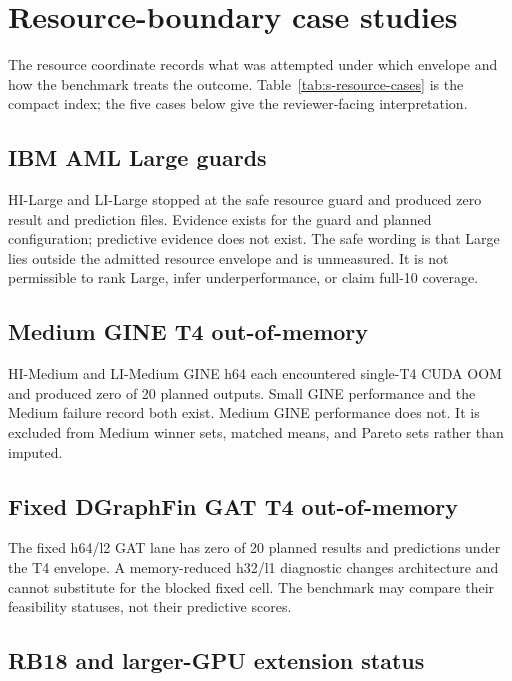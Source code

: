 \section{Resource-boundary case studies}
\label{sec:s-resource-cases-v2}

The resource coordinate records what was attempted under which envelope and how the benchmark treats the outcome. Table~\ref{tab:s-resource-cases} is the compact index; the five cases below give the reviewer-facing interpretation.



\subsection{IBM AML Large guards}

HI-Large and LI-Large stopped at the safe resource guard and produced zero result and prediction files. Evidence exists for the guard and planned configuration; predictive evidence does not exist. The safe wording is that Large lies outside the admitted resource envelope and is unmeasured. It is not permissible to rank Large, infer underperformance, or claim full-10 coverage.

\subsection{Medium GINE T4 out-of-memory}

HI-Medium and LI-Medium GINE h64 each encountered single-T4 CUDA OOM and produced zero of 20 planned outputs. Small GINE performance and the Medium failure record both exist. Medium GINE performance does not. It is excluded from Medium winner sets, matched means, and Pareto sets rather than imputed.

\subsection{Fixed DGraphFin GAT T4 out-of-memory}

The fixed h64/l2 GAT lane has zero of 20 planned results and predictions under the T4 envelope. A memory-reduced h32/l1 diagnostic changes architecture and cannot substitute for the blocked fixed cell. The benchmark may compare their feasibility statuses, not their predictive scores.

\subsection{RB18 and larger-GPU extension status}

